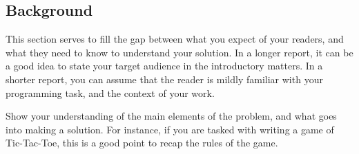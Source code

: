 \subsection{Background}

\label{sec:background}

This section serves to fill the gap between what you expect of your
readers, and what they need to know to understand your solution. In a
longer report, it can be a good idea to state your target audience in
the introductory matters. In a shorter report, you can assume that the
reader is mildly familiar with your programming task, and the context
of your work.

Show your understanding of the main elements of the problem, and what
goes into making a solution. For instance, if you are tasked with
writing a game of Tic-Tac-Toe, this is a good point to recap the rules
of the game.
